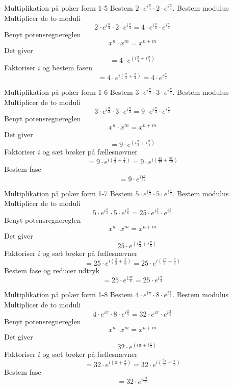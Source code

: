 \documentclass{article}
\begin{document}
\newpage
\begin{exercise}{Multiplikation på polær form 1-5}
Bestem $2 \cdot e^{i \frac{\pi}{4}} \cdot 2 \cdot e^{i \frac{\pi}{4}}$.
\hint
Bestem modulus
\hint
Multiplicer de to moduli
\[2 \cdot e^{i \frac{\pi}{4}} \cdot 2 \cdot e^{i \frac{\pi}{4}} = 4 \cdot e^{i \frac{\pi}{4}} \cdot e^{i \frac{\pi}{4}}
\]
\hint
Benyt potensregnereglen
\[x^n \cdot x^m = x^{n + m}
\]
\hint
Det giver
\[ = 4 \cdot e^{(i \frac{\pi}{4} + i \frac{\pi}{4})}
\]
\hint
Faktoriser $i$ og bestem fasen
\[ = 4 \cdot e^{i( \frac{\pi}{4} + \frac{\pi}{4})} = 4 \cdot e^{i \frac{\pi}{2}}
\]
\end{exercise}
\newpage
\begin{exercise}{Multiplikation på polær form 1-6}
Bestem $3 \cdot e^{i \frac{\pi}{3}} \cdot 3 \cdot e^{i \frac{\pi}{4}}$.
\hint
Bestem modulus
\hint
Multiplicer de to moduli
\[3 \cdot e^{i \frac{\pi}{3}} \cdot 3 \cdot e^{i \frac{\pi}{4}} = 9 \cdot e^{i \frac{\pi}{3}} \cdot e^{i \frac{\pi}{4}}
\]
\hint
Benyt potensregnereglen
\[x^n \cdot x^m = x^{n + m}
\]
\hint
Det giver
\[ = 9 \cdot e^{(i \frac{\pi}{3} + i \frac{\pi}{4})}
\]
\hint
Faktoriser $i$ og sæt brøker på fællesnævner
\[ = 9 \cdot e^{i( \frac{\pi}{3} + \frac{\pi}{4})} = 9 \cdot e^{i( \frac{4 \pi}{12} + \frac{3\pi}{12})}
\]
\hint
Bestem fase
\[ = 9 \cdot e^{i\frac{7 \pi}{12}}
\]
\end{exercise}
\newpage
\begin{exercise}{Multiplikation på polær form 1-7}
Bestem $5 \cdot e^{i \frac{\pi}{3}} \cdot 5 \cdot e^{i \frac{\pi}{6}}$.
\hint
Bestem modulus
\hint
Multiplicer de to moduli
\[5 \cdot e^{i \frac{\pi}{3}} \cdot 5 \cdot e^{i \frac{\pi}{6}} = 25 \cdot e^{i \frac{\pi}{3}} \cdot e^{i \frac{\pi}{6}}
\]
\hint
Benyt potensregnereglen
\[x^n \cdot x^m = x^{n + m}
\]
\hint
Det giver
\[ = 25 \cdot e^{(i \frac{\pi}{3} + i \frac{\pi}{6})}
\]
\hint
Faktoriser $i$ og sæt brøker på fællesnævner
\[ = 25 \cdot e^{i( \frac{\pi}{3} + \frac{\pi}{6})} = 25 \cdot e^{i( \frac{2\pi}{6} + \frac{\pi}{6})}
\]
\hint
Bestem fase og reducer udtryk
\[ = 25 \cdot e^{i \frac{3\pi}{6} } = 25 \cdot e^{i \frac{\pi}{2} }
\]
\end{exercise}
\newpage
\begin{exercise}{Multiplikation på polær form 1-8}
Bestem $4 \cdot e^{i \pi} \cdot 8 \cdot e^{i \frac{\pi}{5}}$.
\hint
Bestem modulus
\hint
Multiplicer de to moduli
\[4 \cdot e^{i \pi} \cdot 8 \cdot e^{i \frac{\pi}{5}} = 32 \cdot e^{i \pi} \cdot e^{i \frac{\pi}{5}}
\]
\hint
Benyt potensregnereglen
\[x^n \cdot x^m = x^{n + m}
\]
\hint
Det giver
\[ = 32 \cdot e^{(i \pi + i \frac{\pi}{5})}
\]
\hint
Faktoriser $i$ og sæt brøker på fællesnævner
\[ = 32 \cdot e^{i( \pi + \frac{\pi}{5})} = 32 \cdot e^{i( \frac{5\pi}{5} + \frac{\pi}{5})}
\]
\hint
Bestem fase
\[ = 32 \cdot e^{i \frac{6 \pi}{5}}
\]
\end{exercise}
\end{document}
